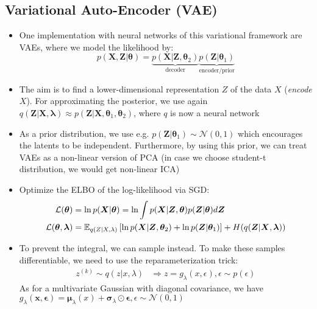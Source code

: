 \subsection{Variational Auto-Encoder (VAE)}
\begin{itemize}
	\item One implementation with neural networks of this variational framework are VAEs, where we model the likelihood by:
	$$p(\bm{X}, \bm{Z}|\bm{\theta}) = \underbrace{p(\bm{X}|\bm{Z}, \bm{\theta}_2)}_{\text{decoder}}\underbrace{p(\bm{Z}|\bm{\theta}_1)}_{\text{encoder/prior}}$$
	\item The aim is to find a lower-dimensional representation $Z$ of the data $X$ (\textit{encode} $X$). For approximating the posterior, we use again $q(\bm{Z}|\bm{X},\bm{\lambda})\approx p(\bm{Z}|\bm{X}, \bm{\theta}_1, \bm{\theta}_2)$, where $q$ is now a neural network
	\item As a prior distribution, we use e.g. $p(\bm{Z}|\bm{\theta}_1) \sim \mathcal{N}(0,1)$ which encourages the latents to be independent. Furthermore, by using this prior, we can treat VAEs as a non-linear version of PCA (in case we choose student-t distribution, we would get non-linear ICA)
	\item Optimize the ELBO of the log-likelihood via SGD:
	\begin{equation*}
		\begin{split}
			\mathcal{L}(\bm{\theta}) & = \ln p(\bm{X}|\bm{\theta}) = \ln \int p(\bm{X}|\bm{Z},\bm{\theta})p(\bm{Z}|\bm{\theta})d\bm{Z}\\
			\mathcal{L}(\bm{\theta}, \bm{\lambda}) & = \mathbb{E}_{q(Z|X,\lambda)}\left[\ln p(\bm{X}|\bm{Z},\bm{\theta}_2) + \ln p(\bm{Z}|\bm{\theta}_1)\right] + H(q(\bm{Z}|\bm{X}, \bm{\lambda}))
		\end{split}
	\end{equation*}
	\item To prevent the integral, we can sample instead. To make these samples differentiable, we need to use the reparameterization trick:
	\begin{equation*}
		\begin{split}
			z^{(k)}\sim q(z|x, \lambda) & \Rightarrow z=g_{\lambda}(x, \epsilon), \epsilon\sim p(\epsilon)
		\end{split}
	\end{equation*}
	As for a multivariate Gaussian with diagonal covariance, we have $g_{\lambda}(\bm{x}, \bm{\epsilon})=\bm{\mu}_{\lambda}(x)+\bm{\sigma}_{\lambda}\odot \bm{\epsilon}, \epsilon\sim\mathcal{N}(0,1)$
\end{itemize}